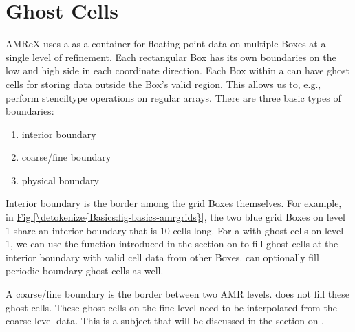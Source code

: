 \documentclass[letterpaper,10pt,english]{sphinxmanual}
\begin{document}
\section{Ghost Cells}
\label{\detokenize{Basics:ghost-cells}}
\sphinxAtStartPar
AMReX uses a  as a container for floating point data on
multiple Boxes at a single level of refinement. Each rectangular Box has its own boundaries
on the low and high side in each coordinate direction.
Each Box within a  can have ghost cells for storing data outside
the Box’s valid region. This allows us to, e.g., perform stencil\sphinxhyphen{}type operations on
regular arrays. There are three basic types of boundaries:
\begin{enumerate}
%
\item {} 
\sphinxAtStartPar
interior boundary

\item {} 
\sphinxAtStartPar
coarse/fine boundary

\item {} 
\sphinxAtStartPar
physical boundary

\end{enumerate}

\sphinxAtStartPar
Interior boundary is the border among the grid Boxes themselves.  For example,
in \hyperref[\detokenize{Basics:fig-basics-amrgrids}]{Fig.\@ \ref{\detokenize{Basics:fig-basics-amrgrids}}}, the two blue grid Boxes on level 1 share an
interior boundary that is 10 cells long. For a  with ghost cells
on level 1, we can use the  function introduced in
the section on {\hyperref[\detokenize{Basics:sec-basics-multifab}]{}} to fill ghost cells at the interior
boundary with valid cell data from other Boxes.  
can optionally fill periodic boundary ghost cells as well.

\sphinxAtStartPar
A coarse/fine boundary is the border between two AMR levels.
 does not fill these ghost cells. These ghost cells on the
fine level need to be interpolated from the coarse level data.  This is a
subject that will be discussed in the section on {\hyperref[\detokenize{AmrCore:sec-amrcore-fillpatch}]{}}.
\end{document}
